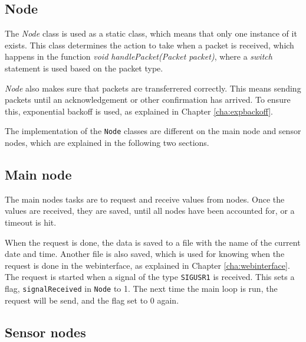 \subsection{Node}
The \textit{Node} class is used as a static class, which means that only one instance of it exists. This class determines the action to take when a packet is received, which happens in the function \textit{void handlePacket(Packet packet)}, where a \textit{switch} statement is used based on the packet type.

\textit{Node} also makes sure that packets are transferrered correctly. This means sending packets until an acknowledgement or other confirmation has arrived. To ensure this, exponential backoff is used, as explained in Chapter \ref{cha:expbackoff}.

The implementation of the \texttt{Node} classes are different on the main node and sensor nodes, which are explained in the following two sections.

\subsection{Main node} \label{cha:signalhandling}
The main nodes tasks are to request and receive values from nodes. Once the values are received, they are saved, until all nodes have been accounted for, or a timeout is hit.

When the request is done, the data is saved to a file with the name of the current date and time. Another file is also saved, which is used for knowing when the request is done in the webinterface, as explained in Chapter \ref{cha:webinterface}. The request is started when a signal of the type \texttt{SIGUSR1} is received. This sets a flag, \texttt{signalReceived} in \texttt{Node} to 1. The next time the main loop is run, the request will be send, and the flag set to 0 again.

\subsection{Sensor nodes} 